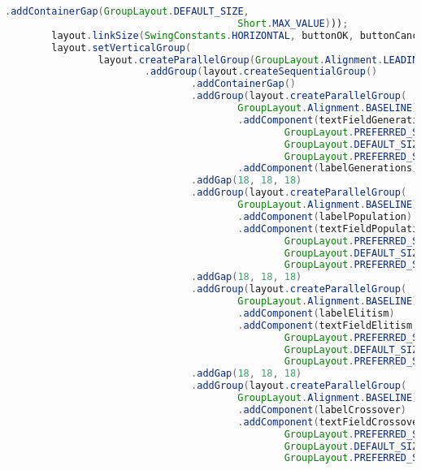 \begin{lstlisting}[language=Java,basicstyle=\tiny,caption=GeneticParameters.java]
                                .addContainerGap(GroupLayout.DEFAULT_SIZE,
                                        Short.MAX_VALUE)));
        layout.linkSize(SwingConstants.HORIZONTAL, buttonOK, buttonCancel);
        layout.setVerticalGroup(
                layout.createParallelGroup(GroupLayout.Alignment.LEADING)
                        .addGroup(layout.createSequentialGroup()
                                .addContainerGap()
                                .addGroup(layout.createParallelGroup(
                                        GroupLayout.Alignment.BASELINE)
                                        .addComponent(textFieldGenerations,
                                                GroupLayout.PREFERRED_SIZE,
                                                GroupLayout.DEFAULT_SIZE,
                                                GroupLayout.PREFERRED_SIZE)
                                        .addComponent(labelGenerations))
                                .addGap(18, 18, 18)
                                .addGroup(layout.createParallelGroup(
                                        GroupLayout.Alignment.BASELINE)
                                        .addComponent(labelPopulation)
                                        .addComponent(textFieldPopulation,
                                                GroupLayout.PREFERRED_SIZE,
                                                GroupLayout.DEFAULT_SIZE,
                                                GroupLayout.PREFERRED_SIZE))
                                .addGap(18, 18, 18)
                                .addGroup(layout.createParallelGroup(
                                        GroupLayout.Alignment.BASELINE)
                                        .addComponent(labelElitism)
                                        .addComponent(textFieldElitism,
                                                GroupLayout.PREFERRED_SIZE,
                                                GroupLayout.DEFAULT_SIZE,
                                                GroupLayout.PREFERRED_SIZE))
                                .addGap(18, 18, 18)
                                .addGroup(layout.createParallelGroup(
                                        GroupLayout.Alignment.BASELINE)
                                        .addComponent(labelCrossover)
                                        .addComponent(textFieldCrossover,
                                                GroupLayout.PREFERRED_SIZE,
                                                GroupLayout.DEFAULT_SIZE,
                                                GroupLayout.PREFERRED_SIZE))

\end{lstlisting}
